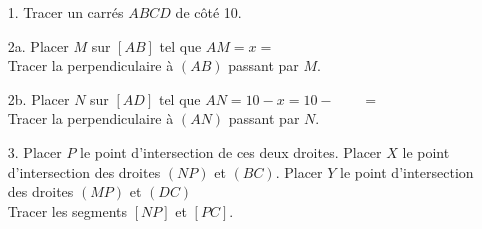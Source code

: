 \documentclass[12pt]{article}
\begin{document}
\begin{enumerate}
\item[1.] Tracer un carrés $ABCD$ de côté 10. 
\item[2a.] Placer $M$ sur $[AB]$ tel que $AM =  x = $\\
Tracer la perpendiculaire à $(AB)$ passant par $M$.
\item[2b.] Placer $N$ sur $[AD]$ tel que $AN = 10 - x = 10 - \phantom{azer} = \phantom{azer}$\\
Tracer la perpendiculaire à $(AN)$ passant par $N$.
\item[3.] Placer $P$ le point d'intersection de ces deux droites. Placer $X$ le point d'intersection  des droites $(NP)$ et $(BC)$. Placer $Y$ le point d'intersection des droites $(MP)$ et $(DC)$\\
Tracer les segments $[NP]$ et $[PC]$.
\end{enumerate}

\newpage
\
\end{document}
